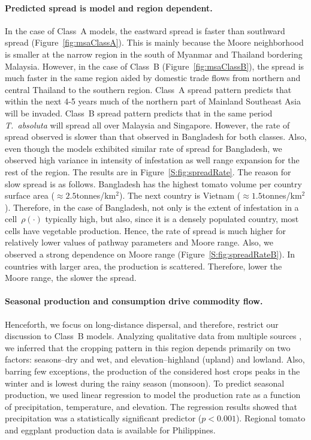 \documentclass[11pt]{article}
\newcommand{\tuta}{\emph{T.~absoluta}}
\newcommand{\infest}{\rho}
\theoremstyle{definition}
\begin{document}
\paragraph{Predicted spread is model and region dependent.} In the case of Class~A
models, the eastward spread is faster than southward spread
(Figure~\ref{fig:msaClassA}). This is mainly because the Moore neighborhood
is smaller at the narrow region in the south of Myanmar and Thailand
bordering Malaysia.  However, in the case of Class~B
(Figure~\ref{fig:msaClassB}), the spread is much faster in the same region
aided by domestic trade flows from northern and central Thailand to the
southern region.  Class~A spread pattern predicts that within the next 4-5
years much of the northern part of Mainland Southeast Asia will be invaded.
Class~B spread pattern predicts that in the same period \tuta{} will spread
all over Malaysia and Singapore.  However, the rate of spread observed is
slower than that observed in Bangladesh for both classes. Also, even though
the models exhibited similar rate of spread for Bangladesh, we observed
high variance in intensity of infestation as well range expansion for the
rest of the region. The results are in Figure~\ref{S:fig:spreadRate}. The
reason for slow spread is as follows.  Bangladesh has the highest tomato
volume per country surface area ($\approx2.5$tonnes/km$^2$).  The next
country is Vietnam ($\approx1.5$tonnes/km$^2$). Therefore, in the case of
Bangladesh, not only is the extent of infestation in a
cell~$\infest(\cdot)$ typically high, but also, since it is a densely
populated country, most cells have vegetable production. Hence, the rate of
spread is much higher for relatively lower values of pathway parameters and
Moore range. Also, we observed a strong dependence on Moore range
(Figure~\ref{S:fig:spreadRateB}).  In countries with larger area, the
production is scattered. Therefore, lower the Moore range, the slower the
spread.

\paragraph{Seasonal production and consumption drive commodity flow.}
Henceforth, we focus on long-distance dispersal, and therefore, restrict our
discussion to Class~B models. Analyzing qualitative data from multiple sources
, we inferred that the
cropping pattern in this region depends primarily on two factors:
seasons--dry and wet, and elevation--highland (upland) and lowland. Also,
barring few exceptions, the production of the considered host crops peaks
in the winter and is lowest during the rainy season (monsoon).  To predict
seasonal production, we used linear regression to model the production rate
as a function of precipitation, temperature, and elevation.   The regression
results showed that precipitation was a statistically significant predictor
($p<0.001$).  Regional tomato and eggplant
production data is available for Philippines.
\end{document}
